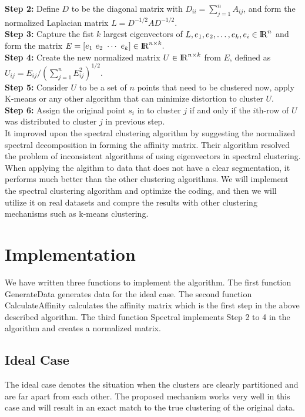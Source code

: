 \documentclass[11pt]{article}
\begin{document}
\textbf{Step 2:} Define $D$ to be the diagonal matrix with $D_{ii} =\sum_{j=1}^{n} A _{ij}$, and form the normalized Laplacian matrix $L = D^{-1/2}AD^{-1/2}$.\\

\textbf{Step 3:} Capture the fist $k$ largest eigenvectors of $L, e_1, e_2,  \ldots, e_k, e_i \in {\rm I\!R}^{n} $ and form the matrix $E = [e_1 ~e_2 ~\cdots ~e_k ] \in  {\rm I\!R}^{n\times k}.$\\

\textbf{Step 4:} Create the new normalized matrix $U \in {\rm I\!R}^{n\times k}$ from $E$, defined as $U_{ij}= E_{ij}/(\sum_{j=1}^{n}E_{ij}^2)^{1/2}$. \\

\textbf{Step 5:} Consider $U$ to be a set of $n$   points that need to be clustered now, apply K-means or any other algorithm that can minimize distortion to cluster $U$. \\

\textbf{Step 6:}  Assign the original point $s_i$ in to cluster $j$ if and only if the $i$th-row of $U$ was distributed to cluster $j$  in previous step.       \\

It improved upon the spectral clustering algorithm by suggesting the normalized spectral decomposition in forming the affinity matrix. Their algorithm resolved the problem of inconsistent algorithms of using eigenvectors in spectral clustering. When applying the algithm to data that does not have a clear segmentation, it performs much better than the other clustering algorithms. We will implement the spectral clustering algorithm and optimize the coding, and then we will utilize it on real datasets and compre the results with other clustering mechanisms such as k-means clustering.



\section{Implementation}
We have written three functions to implement the algorithm. The first function GenerateData generates data for the ideal case. The second function CalculateAffinity calculates the affinity matrix which is the first step in the above described algorithm. The third function Spectral implements Step 2 to 4 in the algorithm and creates a normalized matrix.

\subsection{Ideal Case}
The ideal case denotes the situation when the clusters are clearly partitioned and are far apart from each other. The proposed mechanism works very well in this case and will result in an exact match to the true clustering of the original data.
\end{document}
